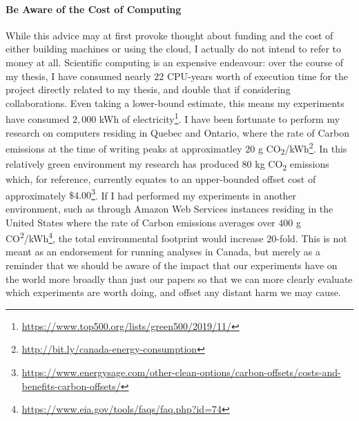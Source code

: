 \paragraph*{Be Aware of the Cost of Computing}
While this advice may at first provoke thought about funding and the cost of either building machines or using the
cloud, I actually do not intend to refer to money at all. Scientific computing is an expensive endeavour: over the
course of my thesis, I have consumed nearly $22$ CPU-years worth of execution time for the project directly related
to my thesis, and double that if considering collaborations. Even taking a lower-bound estimate, this means my
experiments have consumed $2,000$ kWh of electricity\footnote{\url{https://www.top500.org/lists/green500/2019/11/}}.
I have been fortunate to perform my research on computers residing in Quebec and Ontario, where the rate of Carbon
emissions at the time of writing peaks at approximatley $20$ g
CO\textsubscript{2}/kWh\footnote{\url{http://bit.ly/canada-energy-consumption}}. In this relatively green
environment my research has produced $80$ kg CO\textsubscript{2} emissions which, for reference, currently equates
to an upper-bounded offset cost of approximately $\$4.00$\footnote{\url{https://www.energysage.com/other-clean-options/carbon-offsets/costs-and-benefits-carbon-offsets/}}.
If I had performed my experiments in another environment, such as through Amazon Web Services instances residing in
the United States where the rate of Carbon emissions averages over $400$ g
CO\textsuperscript{2}/kWh\footnote{\url{https://www.eia.gov/tools/faqs/faq.php?id=74}}, the total environmental
footprint would increase $20$-fold. This is not meant as an endorsement for running analyses in Canada, but merely
as a reminder that we should be aware of the impact that our experiments have on the world more broadly than just
our papers so that we can more clearly evaluate which experiments are worth doing, and offset any distant harm we
may cause.

